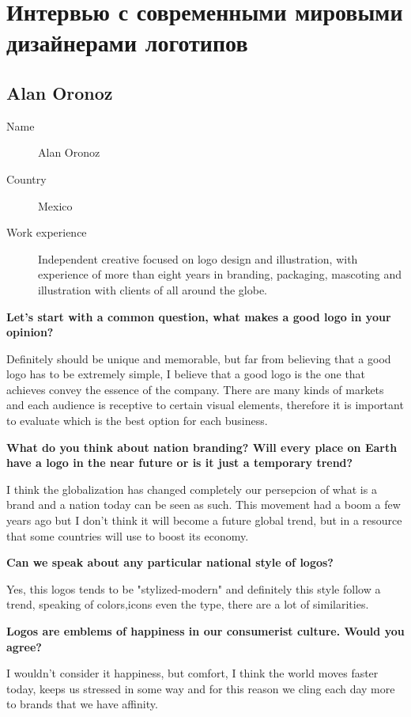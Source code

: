 \section{Интервью с современными мировыми дизайнерами логотипов}

\subsection{Alan Oronoz}

\begin{description}
\item[Name] Alan Oronoz
\item[Country] Mexico
\item[Work experience] Independent creative focused on logo design and
  illustration, with experience of more than eight years in branding, packaging,
  mascoting and illustration with clients of all around the globe.
\end{description}

\textbf{Let's start with a common question, what makes a good logo in your
  opinion?}

Definitely should be unique and memorable, but far from believing that a good
logo has to be extremely simple, I believe that a good logo is the one that
achieves convey the essence of the company. There are many kinds of markets and
each audience is  receptive to certain visual elements, therefore it is
important to evaluate which is the best option for each business.

\textbf{What do you think about nation branding? Will every place on Earth have
  a logo in the near future or is it just a temporary trend?}

I think the globalization has changed completely our persepcion of what is a
brand and a nation today can be seen as such. This movement had a boom a few
years ago but I don't think it will become a future global trend, but in a
resource that some countries will use to boost its economy.


\textbf{Can we speak about any particular national style of logos?}

Yes, this logos tends to be "stylized-modern" and definitely this style follow a
trend, speaking of colors,icons even the type, there are a lot of similarities.


\textbf{Logos are emblems of happiness in our consumerist culture. Would you
  agree?}

I wouldn't consider it happiness, but comfort, I think the world moves faster
today, keeps us stressed in some way and for this reason we cling each day more
to brands that we have affinity.

